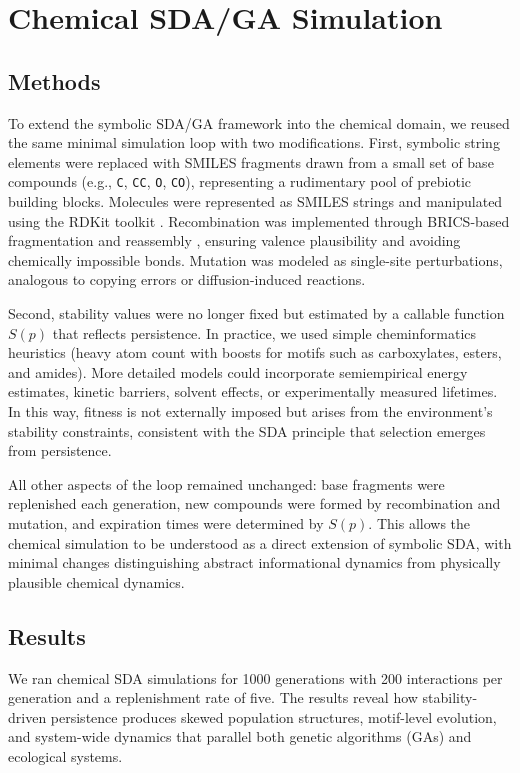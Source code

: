 \documentclass[life,article,submit,pdftex,moreauthors]{Definitions/mdpi}
\begin{document}
\section{Chemical SDA/GA Simulation}

\subsection{Methods}
To extend the symbolic SDA/GA framework into the chemical domain, we reused the same minimal simulation loop with two modifications. First, symbolic string elements were replaced with SMILES fragments drawn from a small set of base compounds (e.g., \texttt{C}, \texttt{CC}, \texttt{O}, \texttt{CO}), representing a rudimentary pool of prebiotic building blocks. Molecules were represented as SMILES strings and manipulated using the RDKit toolkit \cite{landrum2006rdkit}. Recombination was implemented through BRICS-based fragmentation and reassembly \cite{degen2008art}, ensuring valence plausibility and avoiding chemically impossible bonds. Mutation was modeled as single-site perturbations, analogous to copying errors or diffusion-induced reactions.

Second, stability values were no longer fixed but estimated by a callable function $S(p)$ that reflects persistence. In practice, we used simple cheminformatics heuristics (heavy atom count with boosts for motifs such as carboxylates, esters, and amides). More detailed models could incorporate semiempirical energy estimates, kinetic barriers, solvent effects, or experimentally measured lifetimes. In this way, fitness is not externally imposed but arises from the environment’s stability constraints, consistent with the SDA principle that selection emerges from persistence.

All other aspects of the loop remained unchanged: base fragments were replenished each generation, new compounds were formed by recombination and mutation, and expiration times were determined by $S(p)$. This allows the chemical simulation to be understood as a direct extension of symbolic SDA, with minimal changes distinguishing abstract informational dynamics from physically plausible chemical dynamics.


\subsection{Results}

We ran chemical SDA simulations for 1000 generations with 200 interactions per generation and a replenishment rate of five. The results reveal how stability-driven persistence produces skewed population structures, motif-level evolution, and system-wide dynamics that parallel both genetic algorithms (GAs) and ecological systems.  
\end{document}
